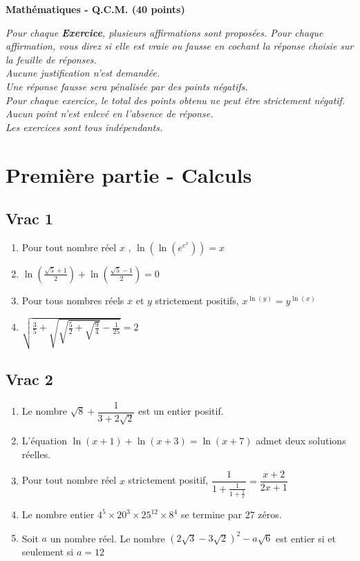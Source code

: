 \documentclass[oneside,12pt]{article}
\begin{document}
\begin{center}
    \large \textbf{Mathématiques - Q.C.M. (40 points)}
\end{center}

\textit{Pour chaque \textbf{Exercice}, plusieurs affirmations sont proposées. Pour chaque affirmation, vous direz si elle est vraie ou fausse en cochant la réponse choisie sur la feuille de réponses. \\
Aucune justification n’est demandée. \\
Une réponse fausse sera pénalisée par des points négatifs. \\
Pour chaque exercice, le total des points obtenu ne peut être strictement négatif. \\
Aucun point n’est enlevé en l’absence de réponse. \\
Les exercices sont tous indépendants.}

\bigskip

\section*{Première partie - Calculs}

\subsection{Vrac 1}
\begin{enumerate}
    \item Pour tout nombre réel $x$ , $\ln\left(\ln\left(e^{e^x}\right)\right) = x$
    \item $\ln\left(\frac{\sqrt{5}+1}{2}\right)+\ln\left(\frac{\sqrt{5}-1}{2}\right)=0$
    \item Pour tous nombres réels $x$ et $y$ strictement positifs, $x^{\ln(y)} = y^{\ln(x)}$
    \item $\sqrt{\frac{3}{5}+\sqrt{\sqrt{\frac{5}{2}+\sqrt{\frac{9}{4}}}-\frac{1}{25}}}=2$
\end{enumerate}



\subsection{Vrac 2}
\begin{enumerate}
	\item Le nombre $\sqrt{8}+\dfrac{1}{3+2\sqrt{2}}$ est un entier positif.
	\item L'équation $\ln(x+1)+\ln(x+3)=\ln(x+7)$ admet deux solutions réelles.
	\item Pour tout nombre réel $x$ strictement positif, $\dfrac{1}{1+\frac{1}{1+\frac{1}{x}}}=\dfrac{x+2}{2x+1}$
	\item Le nombre entier $4^5\times20^3\times25^{12}\times8^4$ se termine par $27$ zéros.
	\item Soit $a$ un nombre réel. Le nombre $\left(2\sqrt{3}-3\sqrt{2}\right)^2-a\sqrt{6}$ est entier si et seulement si $a=12$
\end{enumerate}
\end{document}
